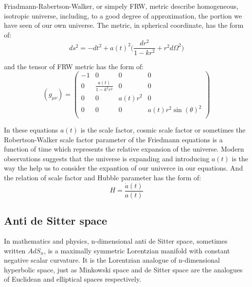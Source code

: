 Friadmann-Rabertson-Walker, or simpely FRW, metric describe homogeneous, isotropic universe, including, to a good degree of approximation, the portion we have seen of our own universe. The metric, in spherical coordinate, has the form of:\\

\begin{equation} \label{eq:FRWMetric}
    ds^2 = -dt^2 + a(t)^2 \big( \frac{dr^2}{1-kr^2} + r^2 d\Omega^2 \big)
\end{equation}

and the tensor of FRW metric has the form of:\\

\begin{equation} \label{eq:FRWSphericalMetricTensor}
    (g_{\mu\nu}) = 
    \begin{pmatrix}
        -1 & 0 & 0 & 0 \\
        0 & \frac{a(t)}{1-k^2r^2} & 0 & 0 \\
        0 & 0 & a(t) r^2 & 0 \\
        0 & 0 & 0 & a(t) r^2 \sin{(\theta)}^2 \\
    \end{pmatrix}
\end{equation}

In these equations $a(t)$ is the scale factor, cosmic scale factor or sometimes the Robertson-Walker scale factor parameter of the Friedmann equations is a function of time which represents the relative expansion of the universe. Modern observations suggests that the universe is expanding and introducing $a(t)$ is the way the help us to consider the expantion of our univerce in our equations. And the relation of scale factor and Hubble parameter has the form of:\\

\begin{equation}
    H = \frac{\dot{a}(t)}{a(t)} 
\end{equation}

\subsection{Anti de Sitter space}

In mathematics and physics, n-dimensional anti de Sitter space, sometimes written $AdS_n$, is a maximally symmetric Lorentzian manifold with constant negative scalar curvature. It is the Lorentzian analogue of n-dimensional hyperbolic space, just as Minkowski space and de Sitter space are the analogues of Euclidean and elliptical spaces respectively.\\

